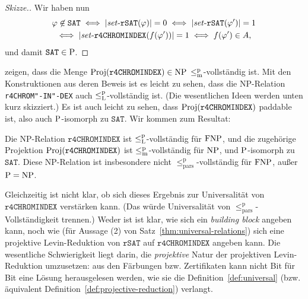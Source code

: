 \begin{proof}[Skizze.]
    Wir haben nun
    \begin{gather*} \phi\not\in\mathtt{SAT} \iff |\fset{}\mathtt{rSAT}(\phi)|=0 \iff |\fset{}\mathtt{rSAT}(\phi')|=1 \\ \iff |\fset{}\mathtt{r4CHROMINDEX}(f(\phi'))|=1 \iff f(\phi') \in A, \end{gather*}
    und damit $\mathtt{SAT}\in\P$.
\end{proof}

\textcite{leven_np_1983} zeigen, dass die Menge $\Proj(\mathtt{r4CHROMINDEX})\in\NP$ $\leqmp$-vollständig ist. 
Mit den Konstruktionen aus deren Beweis ist es leicht zu sehen, dass die NP-Relation \texttt{r4CHROM"-IN"-DEX} auch $\leqlp$-vollständig ist. (Die wesentlichen Ideen werden unten kurz skizziert.)
Es ist auch leicht zu sehen, dass $\Proj(\mathtt{r4CHROMINDEX})$ paddable ist, also  auch $\P$-isomorph zu $\mathtt{SAT}$.
Wir kommen zum Resultat:
\begin{observation}
    Die NP-Relation $\mathtt{r4CHROMINDEX}$ ist $\leqlp$-vollständig für $\FNP$, und die zugehörige Projektion  $\Proj(\mathtt{r4CHROMINDEX})$ ist $\leqmp$-vollständig für $\NP$, und $\P$-isomorph zu $\mathtt{SAT}$.
    Diese NP-Relation ist insbesondere nicht $\leq_\mathrm{pars}^\mathrm p$-vollständig für $\FNP$, außer $\P=\NP$.
\end{observation}

Gleichzeitig ist nicht klar, ob sich dieses Ergebnis zur Universalität von $\mathtt{r4CHROMINDEX}$ verstärken kann. (Das würde Universalität von $\leq_\mathrm{pars}^\mathrm p$-Vollständigkeit trennen.) Weder ist ist klar, wie sich ein \emph{building block} angeben kann, noch wie (für Aussage (2) von Satz~\ref{thm:universal-relations}) sich eine projektive Levin-Reduktion von $\mathtt{rSAT}$ auf $\mathtt{r4CHROMINDEX}$ angeben kann. Die wesentliche Schwierigkeit liegt darin, die \emph{projektive} Natur der projektiven Levin-Reduktion umzusetzen: aus den Färbungen bzw. Zertifikaten kann nicht Bit für Bit eine Lösung herausgelesen werden, wie sie die Definition~\ref{def:universal} (bzw. äquivalent Definition~\ref{def:projective-reduction}) verlangt.

